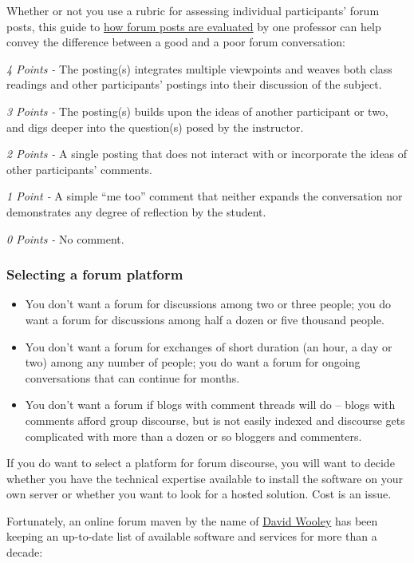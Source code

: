 Whether or not you use a rubric for assessing individual participants'
forum posts, this guide to
\href{http://www.wpi.edu/Academics/ATC/Collaboratory/Idea/boards.html}{how
forum posts are evaluated} by one professor can help convey the
difference between a good and a poor forum conversation:

\emph{4 Points -} The posting(s) integrates multiple viewpoints and
weaves both class readings and other participants' postings into their
discussion of the subject.

\emph{3 Points -} The posting(s) builds upon the ideas of another
participant or two, and digs deeper into the question(s) posed by the
instructor.

\emph{2 Points -} A single posting that does not interact with or
incorporate the ideas of other participants' comments.

\emph{1 Point -} A simple ``me too'' comment that neither expands the
conversation nor demonstrates any degree of reflection by the student.

\emph{0 Points -} No comment.

\subsubsection{Selecting a forum platform}

\begin{itemize}
\itemsep1pt\parskip0pt
\item
  You don't want a forum for discussions among two or three people; you
  do want a forum for discussions among half a dozen or five thousand
  people.
\item
  You don't want a forum for exchanges of short duration (an hour, a day
  or two) among any number of people; you do want a forum for ongoing
  conversations that can continue for months.
\item
  You don't want a forum if blogs with comment threads will do -- blogs
  with comments afford group discourse, but is not easily indexed and
  discourse gets complicated with more than a dozen or so bloggers and
  commenters.
\end{itemize}

If you do want to select a platform for forum discourse, you will want
to decide whether you have the technical expertise available to install
the software on your own server or whether you want to look for a hosted
solution. Cost is an issue.

Fortunately, an online forum maven by the name of
\href{http://thinkofit.com/whoweare.htm}{David Wooley} has been keeping
an up-to-date list of available software and services for more than a
decade:

